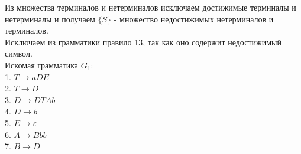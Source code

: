 \documentclass[a4paper,14pt]{extarticle}
\begin{document}
\begin{enumerate}[1.]
Из множества терминалов и нетерминалов исключаем достижимые 
терминалы и нетерминалы и получаем $\{S\}$ - множество недостижимых нетерминалов и терминалов.\\

Исключаем из грамматики правило 13, так как оно содержит недостижимый символ.\\
Искомая грамматика $G_1$:\\
1. $T \rightarrow aDE$\\
2. $T \rightarrow D$\\
3. $D \rightarrow DTAb$\\
4. $D \rightarrow b$\\
5. $E \rightarrow \varepsilon$\\
6. $A \rightarrow Bbb$\\
7. $B \rightarrow D$\\


\end{enumerate}
\end{document}
